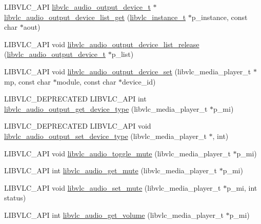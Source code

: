 \begin{DoxyCompactItemize}
\item 
L\+I\+B\+V\+L\+C\+\_\+\+A\+PI \hyperlink{structlibvlc__audio__output__device__t}{libvlc\+\_\+audio\+\_\+output\+\_\+device\+\_\+t} $\ast$ \hyperlink{group__libvlc__audio_ga4f94073a71cd9ee6641ce9bbbfdaf5f3}{libvlc\+\_\+audio\+\_\+output\+\_\+device\+\_\+list\+\_\+get} (\hyperlink{group__libvlc__core_ga316d739a80da4678206c79f4d6c2e284}{libvlc\+\_\+instance\+\_\+t} $\ast$p\+\_\+instance, const char $\ast$aout)
\item 
L\+I\+B\+V\+L\+C\+\_\+\+A\+PI void \hyperlink{group__libvlc__audio_gae96430562ae07bfba7d0e841391be8b3}{libvlc\+\_\+audio\+\_\+output\+\_\+device\+\_\+list\+\_\+release} (\hyperlink{structlibvlc__audio__output__device__t}{libvlc\+\_\+audio\+\_\+output\+\_\+device\+\_\+t} $\ast$p\+\_\+list)
\item 
L\+I\+B\+V\+L\+C\+\_\+\+A\+PI void \hyperlink{group__libvlc__audio_ga4553bc34b90313e6592ad1af0067f31d}{libvlc\+\_\+audio\+\_\+output\+\_\+device\+\_\+set} (libvlc\+\_\+media\+\_\+player\+\_\+t $\ast$mp, const char $\ast$module, const char $\ast$device\+\_\+id)
\item 
L\+I\+B\+V\+L\+C\+\_\+\+D\+E\+P\+R\+E\+C\+A\+T\+ED L\+I\+B\+V\+L\+C\+\_\+\+A\+PI int \hyperlink{group__libvlc__audio_ga8c4c8a6c886a9ed33c7de477f363f76f}{libvlc\+\_\+audio\+\_\+output\+\_\+get\+\_\+device\+\_\+type} (libvlc\+\_\+media\+\_\+player\+\_\+t $\ast$p\+\_\+mi)
\item 
L\+I\+B\+V\+L\+C\+\_\+\+D\+E\+P\+R\+E\+C\+A\+T\+ED L\+I\+B\+V\+L\+C\+\_\+\+A\+PI void \hyperlink{group__libvlc__audio_ga94d41f5e5f0f98a6560c8519f6b9b0d0}{libvlc\+\_\+audio\+\_\+output\+\_\+set\+\_\+device\+\_\+type} (libvlc\+\_\+media\+\_\+player\+\_\+t $\ast$, int)
\item 
L\+I\+B\+V\+L\+C\+\_\+\+A\+PI void \hyperlink{group__libvlc__audio_ga3066a6b5b7b2648ca403ecc506b02116}{libvlc\+\_\+audio\+\_\+toggle\+\_\+mute} (libvlc\+\_\+media\+\_\+player\+\_\+t $\ast$p\+\_\+mi)
\item 
L\+I\+B\+V\+L\+C\+\_\+\+A\+PI int \hyperlink{group__libvlc__audio_ga665d35d090ddd16d971438755ccadb63}{libvlc\+\_\+audio\+\_\+get\+\_\+mute} (libvlc\+\_\+media\+\_\+player\+\_\+t $\ast$p\+\_\+mi)
\item 
L\+I\+B\+V\+L\+C\+\_\+\+A\+PI void \hyperlink{group__libvlc__audio_ga438620a3c817b8b4faceb77c476b89fe}{libvlc\+\_\+audio\+\_\+set\+\_\+mute} (libvlc\+\_\+media\+\_\+player\+\_\+t $\ast$p\+\_\+mi, int status)
\item 
L\+I\+B\+V\+L\+C\+\_\+\+A\+PI int \hyperlink{group__libvlc__audio_ga73a9fef5a0614659261c2d8f1d29b3b7}{libvlc\+\_\+audio\+\_\+get\+\_\+volume} (libvlc\+\_\+media\+\_\+player\+\_\+t $\ast$p\+\_\+mi)

\end{DoxyCompactItemize}
